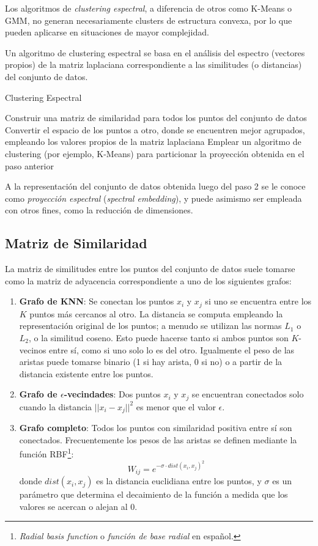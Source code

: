 Los algoritmos de \textit{clustering espectral}, a diferencia de otros como K-Means o GMM, no generan necesariamente clusters de estructura convexa, por lo que pueden aplicarse en situaciones de mayor complejidad.

Un algoritmo de clustering espectral se basa en el análisis del espectro (vectores propios) de la matriz laplaciana correspondiente a las similitudes (o distancias) del conjunto de datos.

\begin{algorithm}
    \caption{Clustering Espectral}
    \label{algorithm:SpectralClustering}
    Construir una matriz de similaridad para todos los puntos del conjunto de datos\;
    Convertir el espacio de los puntos a otro, donde se encuentren mejor agrupados, empleando los valores propios de la matriz laplaciana\;
    Emplear un algoritmo de clustering (por ejemplo, K-Means) para particionar la proyección obtenida en el paso anterior\;
\end{algorithm}

A la representación del conjunto de datos obtenida luego del paso 2 se le conoce como \textit{proyección espectral} (\textit{spectral embedding}), y puede asimismo ser empleada con otros fines, como la reducción de dimensiones.

\subsection{Matriz de Similaridad}\label{subsec:matrizDeSimilaridad}

La matriz de similitudes entre los puntos del conjunto de datos suele tomarse como la matriz de adyacencia correspondiente a uno de los siguientes grafos:

\begin{enumerate}
    \item \textbf{Grafo de KNN}: Se conectan los puntos $x_i$ y $x_j$ si uno se encuentra entre los $K$ puntos más cercanos al otro.
    La distancia se computa empleando la representación original de los puntos;
    a menudo se utilizan las normas $L_1$ o $L_2$, o la similitud coseno.
    Esto puede hacerse tanto si ambos puntos son $K$-vecinos entre sí, como si uno solo lo es del otro.
    Igualmente el peso de las aristas puede tomarse binario (1 si hay arista, 0 si no) o a partir de la distancia existente entre los puntos.

    \item \textbf{Grafo de $\epsilon$-vecindades}: Dos puntos $x_i$ y $x_j$ se encuentran conectados solo cuando la distancia $|| x_i - x_j ||^2$ es menor que el valor $\epsilon$.

    \item \textbf{Grafo completo}: Todos los puntos con similaridad positiva entre sí son conectados.
    Frecuentemente los pesos de las aristas se definen mediante la función RBF\footnote{\textit{Radial basis function} o \textit{función de base radial} en español.}:
    \[
        W_{ij} = e^{-\sigma \cdot dist(x_i , x_j)^2}
    \]
    donde $dist(x_i , x_j)$ es la distancia euclidiana entre los puntos, y $\sigma$ es un parámetro que determina el decaimiento de la función a medida que los valores se acercan o alejan al 0.
\end{enumerate}

